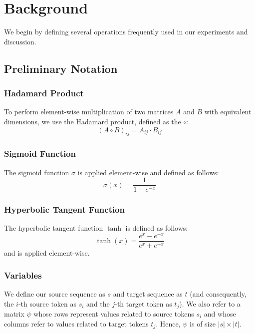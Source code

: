 \documentclass[twoside,twocolumn]{article}
\begin{document}
\section{Background}
We begin by defining several operations frequently used in our experiments
and discussion.

\subsection{Preliminary Notation}

\subsubsection{Hadamard Product}

To perform element-wise multiplication of two matrices $A$ and $B$ with
equivalent dimensions, we use the Hadamard product, defined as the $\circ$:
\begin{equation}
  (A \circ B)_{ij} = A_{ij} \cdot B_{ij}
\end{equation}

\subsubsection{Sigmoid Function}

The sigmoid function $\sigma$ is applied element-wise and defined as follows:
\begin{equation}
  \sigma(x) = \frac{1}{1+e^{-x}}
\end{equation}

\subsubsection{Hyperbolic Tangent Function}

The hyperbolic tangent function $\tanh$ is defined as follows:
\begin{equation}
  \tanh(x) = \frac{e^x - e^{-x}} {e^x + e^{-x}}
\end{equation}
and is applied element-wise.

\subsubsection{Variables}
We define our source sequence as $s$ and target sequence as $t$ (and
consequently, the $i$-th source token as $s_i$ and the $j$-th target token as
$t_j$).
We also refer to a matrix $\psi$ whose rows represent values related to source
tokens $s_i$ and whose columns refer to values related to target tokens $t_j$.
Hence, $\psi$ is of size $|s| \times |t|$.
\end{document}
